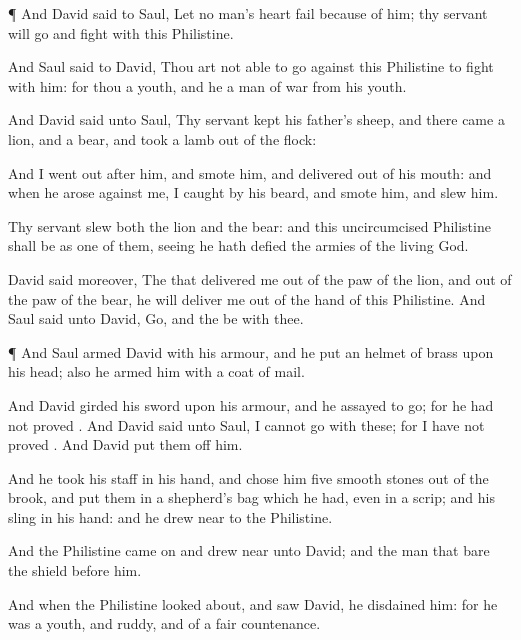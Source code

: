 {\par }{\PP {}¶ And
David
said to
Saul, Let no
man’s
heart
fail because of him; thy
servant will
go and
fight with this
Philistine.

And
Saul
said to
David, Thou art not
able to
go against this
Philistine to
fight with him: for thou
{} a
youth, and he a
man of
war from his
youth.

And
David
said unto
Saul, Thy
servant
kept his
father’s
sheep, and there
came a
lion, and a
bear, and
took a
lamb out of the
flock:

And I went
out
after him, and
smote him, and
delivered
{} out of his
mouth: and when he
arose against me, I
caught
{} by his
beard, and
smote him, and
slew him.

Thy
servant
slew both the
lion and the
bear: and this
uncircumcised
Philistine shall be as
one of them, seeing he hath
defied the
armies of the
living
God.

David
said moreover, The
{} that
delivered me out of the
paw of the
lion, and out of the
paw of the
bear, he will
deliver me out of the
hand of this
Philistine. And
Saul
said unto
David,
Go, and the
{} be with thee.


\par }{\PP {}¶ And
Saul
armed
David with his
armour, and he
put an
helmet of
brass upon his
head; also he
armed him with a coat of
mail.

And
David
girded his
sword upon his
armour, and he
assayed to
go; for he had not
proved
{}. And
David
said unto
Saul, I
cannot
go with these; for I have not
proved
{}. And
David
put them off him.


\par }{\PP {}And he
took his
staff in his
hand, and
chose him
five
smooth
stones out of the
brook, and
put them in a
shepherd’s
bag which he had, even in a
scrip; and his
sling
{} in his
hand: and he drew
near to the
Philistine.

And the
Philistine
came
on and drew
near unto
David; and the
man that
bare the
shield
{}
before him.

And when the
Philistine looked
about, and
saw
David, he
disdained him: for he was
{} a
youth, and
ruddy, and of a
fair
countenance.

}
